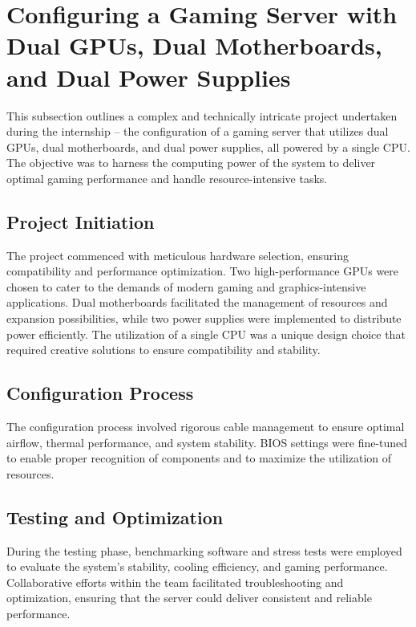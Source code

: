 \section{Configuring a Gaming Server with Dual GPUs, Dual Motherboards, and Dual Power Supplies}

This subsection outlines a complex and technically intricate project undertaken during the internship – the configuration of a gaming server that utilizes dual GPUs, dual motherboards, and dual power supplies, all powered by a single CPU. The objective was to harness the computing power of the system to deliver optimal gaming performance and handle resource-intensive tasks.

\subsection{Project Initiation}

The project commenced with meticulous hardware selection, ensuring compatibility and performance optimization. Two high-performance GPUs were chosen to cater to the demands of modern gaming and graphics-intensive applications. Dual motherboards facilitated the management of resources and expansion possibilities, while two power supplies were implemented to distribute power efficiently. The utilization of a single CPU was a unique design choice that required creative solutions to ensure compatibility and stability.

\subsection{Configuration Process}

The configuration process involved rigorous cable management to ensure optimal airflow, thermal performance, and system stability. BIOS settings were fine-tuned to enable proper recognition of components and to maximize the utilization of resources.

\subsection{Testing and Optimization}

During the testing phase, benchmarking software and stress tests were employed to evaluate the system's stability, cooling efficiency, and gaming performance. Collaborative efforts within the team facilitated troubleshooting and optimization, ensuring that the server could deliver consistent and reliable performance.

